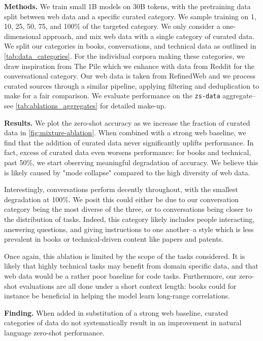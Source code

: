 \documentclass{article}
\begin{document}
\textbf{Methods.} We train small 1B models on 30B tokens, with the pretraining data split between web data and a specific curated category. We sample training on 1, 10, 25, 50, 75, and 100\% of the targeted category. We only consider a one-dimensional approach, and mix web data with a single category of curated data. We split our categories in books, conversations, and technical data as outlined in \cref{tab:data_categories}. For the individual corpora making these categories, we draw inspiration from The Pile \citep{gao2020pile} which we enhance with data from Reddit \citep{baumgartner2020pushshift} for the conversational category. Our web data is taken from RefinedWeb \citep{refinedweb} and we process curated sources through a similar pipeline, applying filtering and deduplication to make for a fair comparison. We evaluate performance on the \texttt{zs-data} aggregate--see \cref{tab:ablations_aggregates} for detailed make-up.

\textbf{Results.} We plot the zero-shot accuracy as we increase the fraction of curated data in \cref{fig:mixture-ablation}. When combined with a strong web baseline, we find that the addition of curated data never significantly uplifts performance. In fact, excess of curated data even worsens performance: for books and technical, past 50\%, we start observing meaningful degradation of accuracy. We believe this is likely caused by "mode collapse" compared to the high diversity of web data. 

Interestingly, conversations perform decently throughout, with the smallest degradation at 100\%. We posit this could either be due to our conversation category being the most diverse of the three, or to conversations being closer to the distribution of tasks. Indeed, this category likely includes people interacting, answering questions, and giving instructions to one another--a style which is less prevalent in books or technical-driven content like papers and patents.

Once again, this ablation is limited by the scope of the tasks considered. It is likely that highly technical tasks may benefit from domain specific data, and that web data would be a rather poor baseline for code tasks. Furthermore, our zero-shot evaluations are all done under a short context length: books could for instance be beneficial in helping the model learn long-range correlations.

\begin{mdframed}
\textbf{Finding.} When added in substitution of a strong web baseline, curated categories of data do not systematically result in an improvement in natural language zero-shot performance.
\end{mdframed}
\end{document}
